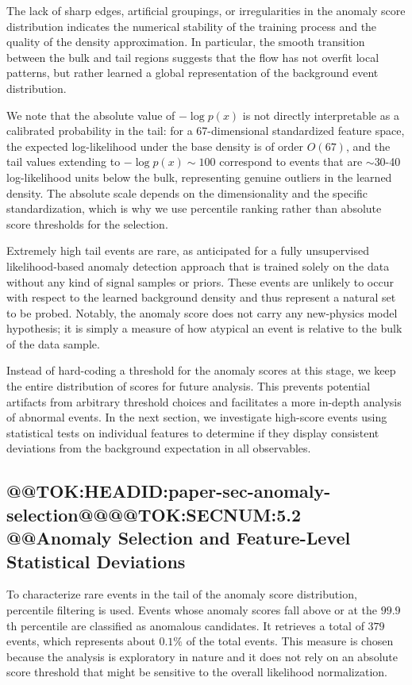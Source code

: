 \documentclass[11pt]{article}
\begin{document}
The lack of sharp edges, artificial groupings, or irregularities in the anomaly score distribution indicates the numerical stability of the training process and the quality of the density approximation. In particular, the smooth transition between the bulk and tail regions suggests that the flow has not overfit local patterns, but rather learned a global representation of the background event distribution.

We note that the absolute value of $-\log p(x)$ is not directly interpretable as a calibrated probability in the tail: for a 67-dimensional standardized feature space, the expected log-likelihood under the base density is of order $O(67)$, and the tail values extending to $-\log p(x) \sim 100$ correspond to events that are $\sim$30-40 log-likelihood units below the bulk, representing genuine outliers in the learned density. The absolute scale depends on the dimensionality and the specific standardization, which is why we use percentile ranking rather than absolute score thresholds for the selection.

Extremely high tail events are rare, as anticipated for a fully unsupervised likelihood-based anomaly detection approach that is trained solely on the data without any kind of signal samples or priors. These events are unlikely to occur with respect to the learned background density and thus represent a natural set to be probed. Notably, the anomaly score does not carry any new-physics model hypothesis; it is simply a measure of how atypical an event is relative to the bulk of the data sample.

Instead of hard-coding a threshold for the anomaly scores at this stage, we keep the entire distribution of scores for future analysis. This prevents potential artifacts from arbitrary threshold choices and facilitates a more in-depth analysis of abnormal events. In the next section, we investigate high-score events using statistical tests on individual features to determine if they display consistent deviations from the background expectation in all observables.

\subsection{@@TOK:HEADID:paper-sec-anomaly-selection@@@@TOK:SECNUM:5.2 @@Anomaly Selection and Feature-Level Statistical Deviations}

To characterize rare events in the tail of the anomaly score distribution, percentile filtering is used. Events whose anomaly scores fall above or at the $99.9$th percentile are classified as anomalous candidates. It retrieves a total of $379$ events, which represents about $0.1\%$ of the total events. This measure is chosen because the analysis is exploratory in nature and it does not rely on an absolute score threshold that might be sensitive to the overall likelihood normalization.
\end{document}
